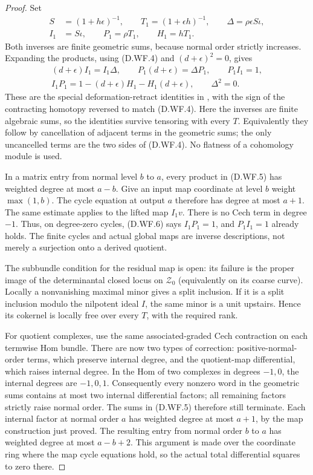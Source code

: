 \begin{proof}
Set
\[
 \begin{split}
 S&=(1+h\epsilon)^{-1},\qquad
 T_1=(1+\epsilon h)^{-1},\qquad
 \Delta=\rho\epsilon S\iota,\\
 I_1&=S\iota,\qquad P_1=\rho T_1,\qquad H_1=hT_1.
 \end{split}                                           \tag{D.WF.5}
\]
Both inverses are finite geometric sums, because normal order
strictly increases. Expanding the products, using (D.WF.4)
and $(d+\epsilon)^2=0$, gives
\[
 \begin{gathered}
 (d+\epsilon)I_1=I_1\Delta,\qquad
 P_1(d+\epsilon)=\Delta P_1,\qquad P_1I_1=1,\\
 I_1P_1=1-(d+\epsilon)H_1-H_1(d+\epsilon),\qquad
 \Delta^2=0.                                           \tag{D.WF.6}
 \end{gathered}
\]
These are the special deformation-retract identities in
\citet[Sections 2.1--2.4, complete proof, and Section 3.2,
pp.~1--4]{C_Crainic2004Perturbation}, with the sign of the
contracting homotopy reversed to match (D.WF.4).
Here the inverses are finite algebraic sums, so the identities
survive tensoring with every $T$. Equivalently they follow by cancellation of
adjacent terms in the geometric sums; the only uncancelled
terms are the two sides of (D.WF.4). No flatness of a
cohomology module is used.

In a matrix entry from normal level $b$ to $a$, every product
in (D.WF.5) has weighted degree at most $a-b$. Give an input
map coordinate at level $b$ weight $\max(1,b)$. The cycle
equation at output $a$ therefore has degree at most $a+1$.
The same estimate applies to the lifted map $I_1v$.
There is no Cech term in degree $-1$. Thus, on degree-zero
cycles, (D.WF.6) says $I_1P_1=1$, and $P_1I_1=1$ already
holds. The finite cycles and actual global maps are inverse
descriptions, not merely a surjection onto a derived quotient.

The subbundle condition for the residual map is open: its
failure is the proper image of the determinantal closed
locus on $\mathcal Z_0$ (equivalently on its coarse curve).
Locally a nonvanishing maximal minor gives a split inclusion.
If it is a split inclusion modulo the nilpotent ideal $I$,
the same minor is a unit upstairs. Hence its cokernel is
locally free over every $T$, with the required rank.

For quotient complexes, use the same associated-graded Cech
contraction on each termwise Hom bundle. There are now two
types of correction: positive-normal-order terms, which
preserve internal degree, and the quotient-map differential,
which raises internal degree. In the Hom of two complexes
in degrees $-1,0$, the internal degrees are $-1,0,1$.
Consequently every nonzero word in the geometric sums
contains at most two internal differential factors; all
remaining factors strictly raise normal order. The sums in
(D.WF.5) therefore still terminate. Each internal factor at
normal order $a$ has weighted degree at most $a+1$, by the
map construction just proved. The resulting entry from
normal order $b$ to $a$ has weighted degree at most
$a-b+2$. This argument is made over the coordinate ring
where the map cycle equations hold, so the actual total
differential squares to zero there.


\end{proof}
